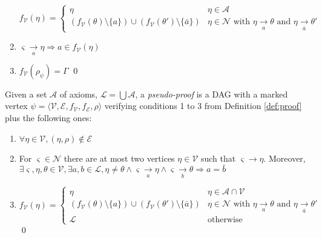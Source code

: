 \documentclass{llncs}
\newcommand{\dual}[1]{\ensuremath{\bar{#1}}}
\begin{document}
\begin{definition}[Proof]
\begin{enumerate}
    \begin{equation*}
      f_\mathcal{V}(\eta) = \begin{cases}
        \eta & \eta \in \mathcal{A} \\
        \left(f_\mathcal{V}(\theta) \setminus \{a\}\right) \cup
        \left(f_\mathcal{V}(\theta') \setminus \{\dual{a}\}\right) &
              \eta \in \mathcal{N} \text{ with } \eta \xrightarrow[a]{} \theta \text{ and }
                                               \eta \xrightarrow[\dual{a}]{} \theta'
      \end{cases}
    \end{equation*}
  \item $\varsigma \xrightarrow[a]{} \eta \Rightarrow a \in f_\mathcal{V}(\eta)$
  \item $f_\mathcal{V}(\rho_\psi) = \Gamma$
  \qed
\end{enumerate}
\end{definition}

\begin{definition}
Given a set $\mathcal{A}$ of axioms, $\mathcal{L} = \bigcup{\mathcal{A}}$, a \emph{pseudo-proof} is
a DAG with a marked vertex $\psi = \langle \mathcal{V}, \mathcal{E}, f_\mathcal{V}, f_\mathcal{E},
\rho \rangle$ verifying conditions 1 to 3 from Definition \ref{def:proof} plus the following ones:
\begin{enumerate}%
  \item $\forall \eta \in \mathcal{V}, (\eta, \rho) \notin \mathcal{E}$
  \item For $\varsigma \in \mathcal{N}$ there are at most two vertices $\eta \in \mathcal{V}$ such
    that $\varsigma \rightarrow \eta$. Moreover, $\exists \varsigma, \eta, \theta \in \mathcal{V},
    \exists a, b \in \mathcal{L}, \eta \neq \theta \wedge \varsigma \xrightarrow[a]{} \eta \wedge
    \varsigma \xrightarrow[b]{} \theta \Rightarrow a = \dual{b}$
  \item %
    \begin{equation*}
      f_\mathcal{V}(\eta) = \begin{cases}
        \eta & \eta \in \mathcal{A} \cap \mathcal{V} \\
        \left(f_\mathcal{V}(\theta) \setminus \{a\}\right) \cup
        \left(f_\mathcal{V}(\theta') \setminus \{\dual{a}\}\right) &
              \eta \in \mathcal{N} \text{ with } \eta \xrightarrow[a]{} \theta \text{ and }
                                               \eta \xrightarrow[\dual{a}]{} \theta' \\
        \mathcal{L} & \text{otherwise}
      \end{cases}
    \end{equation*}
  \qed
\end{enumerate}
\end{definition}
\end{document}
